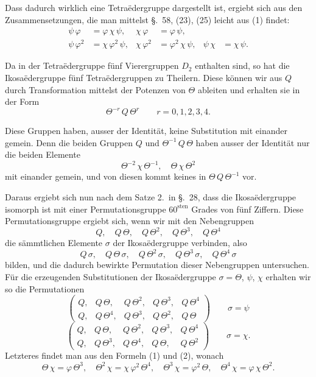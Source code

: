 \documentclass[12pt,a4paper]{article}
\begin{document}
Dass dadurch wirklich eine Tetraëdergruppe dargestellt ist, ergiebt sich aus den Zusammensetzungen, die man mittelst \S.~58, (23), (25) leicht aus (1) findet:
\begin{equation}\label{eq:59.5}
\tag{5}
\begin{aligned}
\psi\,\varphi &= \varphi\,\chi\,\psi, & \chi\,\varphi &= \varphi\,\psi,\\
\psi\,\varphi^{2} &= \chi\,\varphi^{2}\,\psi, &
\chi\,\varphi^{2} &= \varphi^{2}\,\chi\,\psi, &
\psi\,\chi &= \chi\,\psi.
\end{aligned}
\end{equation}

Da in der Tetraëdergruppe fünf Vierergruppen $D_{2}$ enthalten sind, so hat die Ikosaëdergruppe fünf Tetraëdergruppen zu Theilern. Diese können wir aus $Q$ durch Transformation mittelst der Potenzen von $\Theta$ ableiten und erhalten sie in der Form
\[
\Theta^{-r}\,Q\,\Theta^{r}\qquad r = 0,1,2,3,4.
\]

Diese Gruppen haben, ausser der Identität, keine Substitution mit einander gemein. Denn die beiden Gruppen $Q$ und $\Theta^{-1}\,Q\,\Theta$ haben ausser der Identität nur die beiden Elemente
\[
\Theta^{-2}\,\chi\,\Theta^{-1},\quad \Theta\,\chi\,\Theta^{2}
\]
mit einander gemein, und von diesen kommt keines in $\Theta\,Q\,\Theta^{-1}$ vor.

Daraus ergiebt sich nun nach dem Satze 2.~in \S.~28, dass die Ikosaëdergruppe isomorph ist mit einer Permutationsgruppe $60^{\text{sten}}$ Grades von fünf Ziffern. Diese Permutationsgruppe ergiebt sich, wenn wir mit den Nebengruppen
\[
Q,\quad Q\,\Theta,\quad Q\,\Theta^{2},\quad Q\,\Theta^{3},\quad Q\,\Theta^{4}
\]
die sämmtlichen Elemente $\sigma$ der Ikosaëdergruppe verbinden, also
\[
Q\,\sigma,\quad Q\,\Theta\,\sigma,\quad Q\,\Theta^{2}\,\sigma,\quad Q\,\Theta^{3}\,\sigma,\quad Q\,\Theta^{4}\,\sigma
\]
bilden, und die dadurch bewirkte Permutation dieser Nebengruppen untersuchen. Für die erzeugenden Substitutionen der Ikosaëdergruppe $\sigma = \Theta$, $\psi$, $\chi$ erhalten wir so die Permutationen
\[
\begin{pmatrix}
Q, & Q\,\Theta, & Q\,\Theta^{2}, & Q\,\Theta^{3}, & Q\,\Theta^{4}\\
Q, & Q\,\Theta^{4}, & Q\,\Theta^{3}, & Q\,\Theta^{2}, & Q\,\Theta
\end{pmatrix}
\qquad \sigma = \psi
\]
\[
\begin{pmatrix}
Q, & Q\,\Theta, & Q\,\Theta^{2}, & Q\,\Theta^{3}, & Q\,\Theta^{4}\\
Q, & Q\,\Theta^{3}, & Q\,\Theta^{4}, & Q\,\Theta, & Q\,\Theta^{2}
\end{pmatrix}
\qquad \sigma = \chi.
\]
Letzteres findet man aus den Formeln (1) und (2), wonach
\[
\Theta\,\chi = \varphi\,\Theta^{3},\quad
\Theta^{2}\,\chi = \chi\,\varphi^{2}\,\Theta^{4},\quad
\Theta^{3}\,\chi = \varphi^{2}\,\Theta,\quad
\Theta^{4}\,\chi = \varphi\,\chi\,\Theta^{2}.
\]
\end{document}
